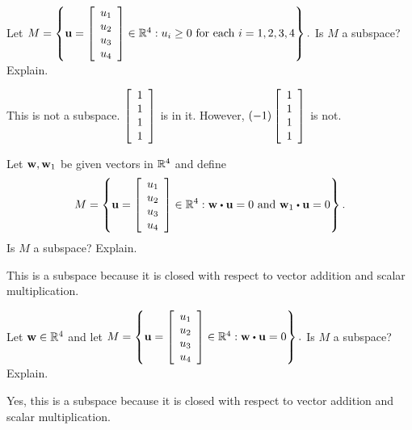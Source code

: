 \begin{enumialphparenastyle}
\begin{ex} Let $M=\left\{ {\bf u}=\left[ \begin{array}{c}
u_{1} \\
u_{2} \\
u_{3} \\
u_{4}
\end{array}\right] \in 
\mathbb{R}^{4}:u_{i}\geq 0\mbox{ for each }i=1,2,3,4\right\} .$ Is $M$ a
subspace? Explain.
\begin{sol}
This is not a subspace. $\left[ \begin{array}{r}
1 \\
1 \\
1 \\
1
\end{array}
\right] $
is in it. However, $\left( -1\right) \left[
\begin{array}{r}
1 \\
1 \\
1 \\
1
\end{array}
\right] $ is not.
\end{sol}
\end{ex}

\begin{ex} Let ${\bf w},{\bf w}_{1}$ be given vectors in $\mathbb{R}^{4}$ and define 
\begin{equation*}
M=\left\{ \vect{u}=\leftB \begin{array}{c}
u_{1} \\
u_{2} \\
u_{3} \\
u_{4}
\end{array}\rightB \in \R
^{4}:\vect{w}\dotprod \vect{u}=0\text{ and }\vect{w}_{1}\dotprod \vect{u}=0\right\}
.
\end{equation*}
Is $M$ a subspace? Explain.
\begin{sol}
This is a subspace because it is closed
with respect to vector addition and scalar multiplication.
\end{sol}
\end{ex}


\begin{ex} Let ${\bf w}\in \mathbb{R}^{4}$ and let $M=\left\{ \vect{u}
=\leftB 
\begin{array}{c}
u_{1} \\
u_{2} \\
u_{3} \\
u_{4}
\end{array}\rightB \in \R^{4}:\vect{w}\dotprod \vect{u}
=0\right\} .$ Is $M$ a subspace? Explain.
\begin{sol}
Yes, this is a subspace because it is closed with respect to vector addition and scalar multiplication.
\end{sol}
\end{ex}


\end{enumialphparenastyle}

